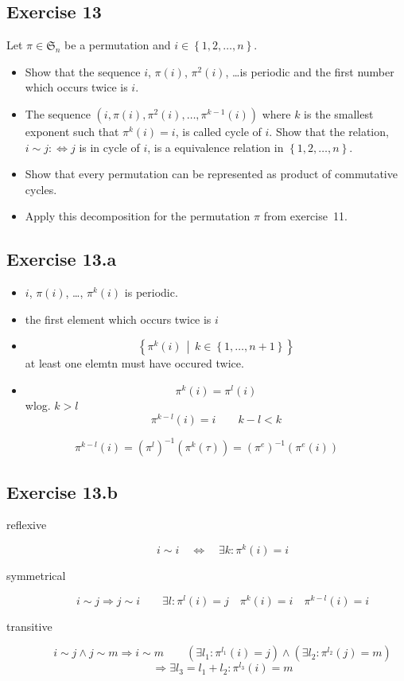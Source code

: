 \documentclass[a4paper]{article}
\theoremstyle{definition}
\newcommand\set[1]{\left\{#1\right\}}
\newcommand\setdef[2]{\left\{#1\,\middle|\,#2\right\}}
\begin{document}
\subsection{Exercise 13}
\begin{ex}
  Let $\pi \in \mathfrak S_n$ be a permutation and $i \in \set{1,2,\ldots,n}$.
  \begin{itemize}
    \item Show that the sequence $i$, $\pi(i)$, $\pi^2(i)$, \ldots is periodic and the first number
      which occurs twice is $i$.
    \item The sequence $(i, \pi(i), \pi^2(i), \ldots, \pi^{k-1}(i))$ where $k$ is the smallest exponent
      such that $\pi^k(i) = i$, is called cycle of $i$. Show that the relation,
      $i \sim j: \Leftrightarrow j$ is in cycle of $i$, is a equivalence relation in $\set{1,2,\ldots,n}$.
    \item Show that every permutation can be represented as product of commutative cycles.
    \item Apply this decomposition for the permutation $\pi$ from exercise~11.
  \end{itemize}
\end{ex}

\subsection{Exercise 13.a}

\begin{itemize}
  \item $i$, $\pi(i)$, \ldots, $\pi^k(i)$ is periodic.
  \item the first element which occurs twice is $i$
  \item
    \[ \setdef{\pi^k(i)}{k \in \set{1, \ldots, n+1}} \]
    at least one elemtn must have occured twice.
  \item
    \[ \pi^k(i) = \pi^l(i) \]
    wlog. $k > l$
    \[ \pi^{k-l}(i) = i \qquad k-l < k \]
\end{itemize}

\[ \pi^{k-l}(i) = (\pi^l)^{-1} \left(\pi^k (\tau)\right) = \left(\pi^e\right)^{-1} \left(\pi^e(i)\right) \]

\subsection{Exercise 13.b}

\begin{description}
  \item[reflexive]
    \[ i \sim i \quad\Leftrightarrow\quad \exists k: \pi^k(i) = i \]
  \item[symmetrical]
    \[
      i \sim j \Rightarrow j \sim i
      \qquad
      \exists l: \pi^l(i) = j \quad
      \pi^k(i) = i \quad
      \pi^{k-l}(i) = i
    \]
  \item[transitive]
    \[
      i \sim j \land j \sim m \Rightarrow i \sim m
      \qquad
      (\exists l_1: \pi^{l_1}(i) = j) \land (\exists l_2: \pi^{l_2}(j) = m)
    \]
    \[ \Rightarrow \exists l_3 = l_1 + l_2: \pi^{l_3}(i) = m \]
\end{description}
\end{document}
